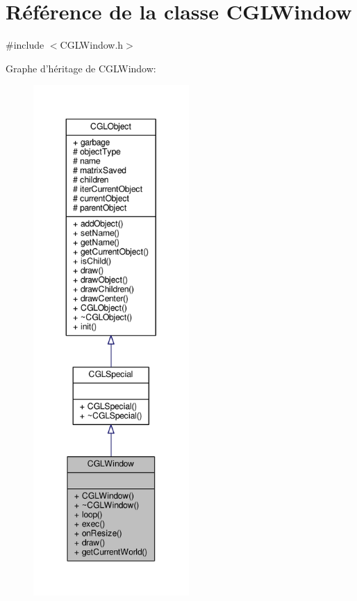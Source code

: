 \hypertarget{class_c_g_l_window}{\section{Référence de la classe C\-G\-L\-Window}
\label{class_c_g_l_window}
}


{\ttfamily \#include $<$C\-G\-L\-Window.\-h$>$}



Graphe d'héritage de C\-G\-L\-Window\-:\nopagebreak
\begin{figure}[H]
\begin{center}
\leavevmode
\includegraphics[height=550pt]{da/d6e/class_c_g_l_window__inherit__graph}
\end{center}
\end{figure}


